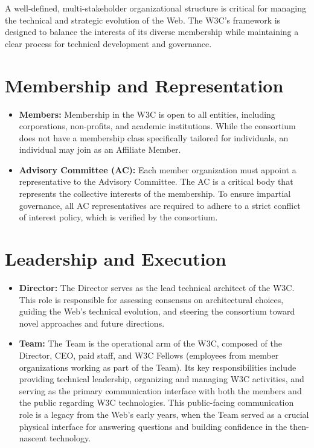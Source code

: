 \documentclass{scrbook}
\begin{document}
A well-defined, multi-stakeholder organizational structure is critical for managing the technical and strategic evolution of the Web. The W3C's framework is designed to balance the interests of its diverse membership while maintaining a clear process for technical development and governance.

\section{Membership and Representation}

\begin{itemize}
    \item
    \textbf{Members:} Membership in the W3C is open to all entities, including corporations, non-profits, and academic institutions. While the consortium does not have a membership class specifically tailored for individuals, an individual may join as an Affiliate Member.

    \item 
    \textbf{Advisory Committee (AC):} Each member organization must appoint a representative to the Advisory Committee. The AC is a critical body that represents the collective interests of the membership. To ensure impartial governance, all AC representatives are required to adhere to a strict conflict of interest policy, which is verified by the consortium.
\end{itemize}

\section{Leadership and Execution}

\begin{itemize}
    \item 
    \textbf{Director:} The Director serves as the lead technical architect of the W3C. This role is responsible for assessing consensus on architectural choices, guiding the Web's technical evolution, and steering the consortium toward novel approaches and future directions.

    \item 
    \textbf{Team:} The Team is the operational arm of the W3C, composed of the Director, CEO, paid staff, and W3C Fellows (employees from member organizations working as part of the Team). Its key responsibilities include providing technical leadership, organizing and managing W3C activities, and serving as the primary communication interface with both the members and the public regarding W3C technologies. This public-facing communication role is a legacy from the Web's early years, when the Team served as a crucial physical interface for answering questions and building confidence in the then-nascent technology.
\end{itemize}
\end{document}

